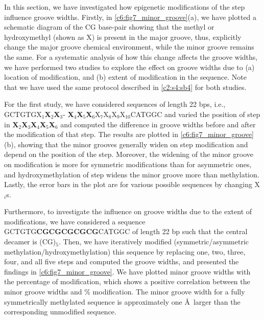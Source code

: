 In this section, we have investigated how epigenetic modifications of the \cpg step influence groove widths. 
Firstly, in \cref{c6:fig7_minor_groove}(a), we have plotted a schematic diagram of the CG base-pair showing that the methyl or hydroxymethyl (shown as X) is present in the major groove, thus, explicitly change the major groove chemical environment, while the minor groove remains the same.
For a systematic analysis of how this change affects the groove widths, we have performed two studies to explore the effect on groove widths due to (a) location of \cpg modification, and (b) extent of \cpg modification in the sequence. 
Note that we have used the same protocol described in \cref{c2:s4:sb4} for both studies.

For the first study, we have considered sequences of length 22 bps, i.e., GCTGTGX$_1$\textbf{X$_2$X$_3$}- \textbf{X$_4$X$_5$X$_6$}X$_7$X$_8$X$_9$X$_{10}$CATGGC and varied the position of \cpg step in \textbf{X$_2$X$_3$X$_4$X$_5$X$_6$} and computed the difference in groove widths before and after the modification of that \cpg step.
The results are plotted in \cref{c6:fig7_minor_groove}(b), showing that the minor grooves generally widen on \cpg step modification and depend on the position of the \cpg step. 
Moreover, the widening of the minor groove on \cpg modification is more for symmetric modifications than for asymmetric ones, and hydroxymethylation of \cpg step widens the minor groove more than methylation.
Lastly, the error bars in the plot are for various possible sequences by changing X$_i$s.

Furthermore, to investigate the influence on groove widths due to the extent of \cpg modifications, we have considered a sequence GCTGTG\textbf{CGCGCGCGCG}CATGGC of length 22 bp such that the central decamer is (CG)$_5$.
Then, we have iteratively modified (symmetric/asymmetric methylation/hydroxymethylation) this sequence by replacing one, two, three, four, and all five \cpg steps and computed the groove widths, and presented the findings in \cref{c6:fig7_minor_groove}. We have plotted minor groove widths with the percentage of \cpg modification, which shows a positive correlation between the minor groove widths and \% \cpg modification.
The minor groove width for a fully symmetrically methylated sequence is approximately one \AA \ larger than the corresponding unmodified sequence. \hfill \clearpage

